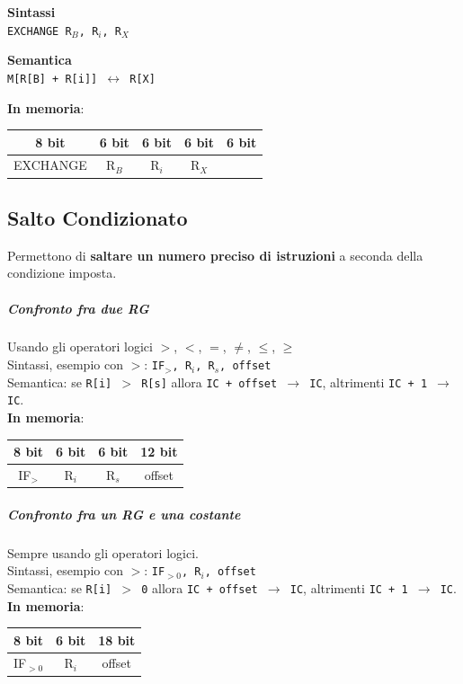 \documentclass[10pt]{report}
\begin{document}
\begin{multicols}{2}
\begin{center}
\textbf{Sintassi}\\
\texttt{EXCHANGE R$_B$, R$_i$, R$_X$}
\end{center}
\columnbreak
\begin{center}
\textbf{Semantica}\\
\texttt{M[R[B] + R[i]] $\leftrightarrow$ R[X]}
\end{center}
\end{multicols}
\begin{center}
\textbf{In memoria}:  
\begin{tabular}{| c | c | c | c | c |}
\hline
8 bit & 6 bit & 6 bit & 6 bit & 6 bit\\
\hline
EXCHANGE & R$_B$ & R$_i$ & R$_X$  & \\
\hline
\end{tabular}
\end{center}
\subsection{Salto Condizionato}
Permettono di \textbf{saltare un numero preciso di istruzioni} a seconda della condizione imposta.
\subparagraph{Confronto fra due RG} Usando gli operatori logici $>$, $<$, $=$, $\neq$, $\leq$, $\geq$\\
Sintassi, esempio con $>$: \texttt{IF$_>$, R$_i$, R$_s$, offset}\\
Semantica: se \texttt{R[i] $>$ R[s]} allora \texttt{IC + offset $\rightarrow$ IC}, altrimenti \texttt{IC + 1 $\rightarrow$ IC}.\\
\textbf{In memoria}:  
\begin{tabular}{| c | c | c | c |}
\hline
8 bit & 6 bit & 6 bit & 12 bit \\
\hline
IF$_>$ & R$_i$ & R$_s$ & offset \\
\hline
\end{tabular}
\subparagraph{Confronto fra un RG e una costante} Sempre usando gli operatori logici.\\
Sintassi, esempio con $>$: \texttt{IF$_{> 0}$, R$_i$, offset}\\
Semantica: se \texttt{R[i] $>$ 0} allora \texttt{IC + offset $\rightarrow$ IC}, altrimenti \texttt{IC + 1 $\rightarrow$ IC}.\\
\textbf{In memoria}:  
\begin{tabular}{| c | c | c |}
\hline
8 bit & 6 bit & 18 bit \\
\hline
IF$_{> 0}$ & R$_i$ & offset \\
\hline
\end{tabular}
\end{document}
